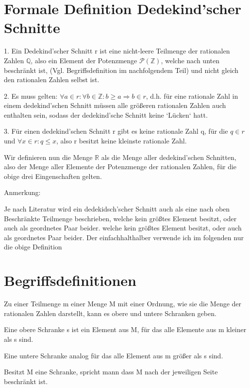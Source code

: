 \documentclass[12pt]{article}
\begin{document}
    \section{Formale Definition Dedekind'scher Schnitte}

    1. Ein Dedekind'scher Schnitt r ist eine nicht-leere Teilmenge der rationalen Zahlen $\mathbb{Q}$,
    also ein Element der Potenzmenge $\mathcal{P}(\mathbb{Z})$, welche nach unten beschränkt ist,
    (Vgl. Begriffsdefinition im nachfolgendem Teil) und nicht gleich den rationalen Zahlen selbst ist.

    2. Es muss gelten: $\forall a \in r: \forall b \in \mathbb{Z}: b \ge a \Rightarrow b \in r$, d.h.
    für eine rationale Zahl in einem dedekind'schen Schnitt müssen alle größeren rationalen Zahlen auch enthalten sein,
    sodass der dedekind'sche Schnitt keine `Lücken` hatt.

    3. Für einen dedekind'schen Schnitt r gibt es keine rationale Zahl q, für die $q \in r$ und $\forall x \in r: q \le x$,
    also r besitzt keine kleinste rationale Zahl.

    Wir definieren nun die Menge $\mathbb{R}$ als die Menge aller dedekind'schen Schnitten, also der Menge aller
    Elemente der Potenzmenge der rationalen Zahlen, für die obige drei Eingenschaften gelten.

    Anmerkung:

    Je nach Literatur wird ein dedekidsch'scher Schnitt auch als eine nach oben Beschränkte Teilmenge beschrieben,
    welche kein größtes Element besitzt, oder auch als geordnetes Paar beider.
    welche kein größtes Element besitzt, oder auch als geordnetes Paar beider. Der einfachhalthalber
    verwende ich im folgenden nur die obige Definition

    \section{Begriffsdefinitionen}

    Zu einer Teilmenge m einer Menge M mit einer Ordnung, wie sie die Menge der rationalen Zahlen darstellt,
    kann es obere und untere Schranken geben.

    Eine obere Schranke s ist ein Element aus M, für das alle Elemente aus m kleiner als s sind.

    Eine untere Schranke analog für das alle Element aus m größer als s sind.

    Besitzt M eine Schranke, spricht mann dass M nach der jeweiligen Seite beschränkt ist.
\end{document}
